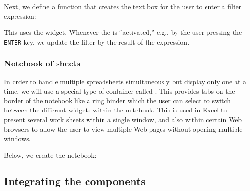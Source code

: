 \documentclass[article,shortnames]{jss}
\begin{document}
Next, we define a function that creates the text box for the user to
enter a filter expression:
This uses the  widget.
Whenever the  is ``activated,'' e.g., by the user
pressing the \texttt{ENTER} key, we update the filter by the result of
the  expression.

\subsubsection{Notebook of sheets}

In order to handle multiple spreadsheets simultaneously but display
only one at a time, we will use a special type of container called
.  This provides tabs on the border of the
notebook like a ring binder which the user can select to switch
between the different widgets within the notebook.  This is used in
Excel to present several work sheets within a single window, and also
within certain Web browsers to allow the user to view multiple Web
pages without opening multiple windows.

Below, we create the notebook:

\subsection{Integrating the components}
\end{document}
